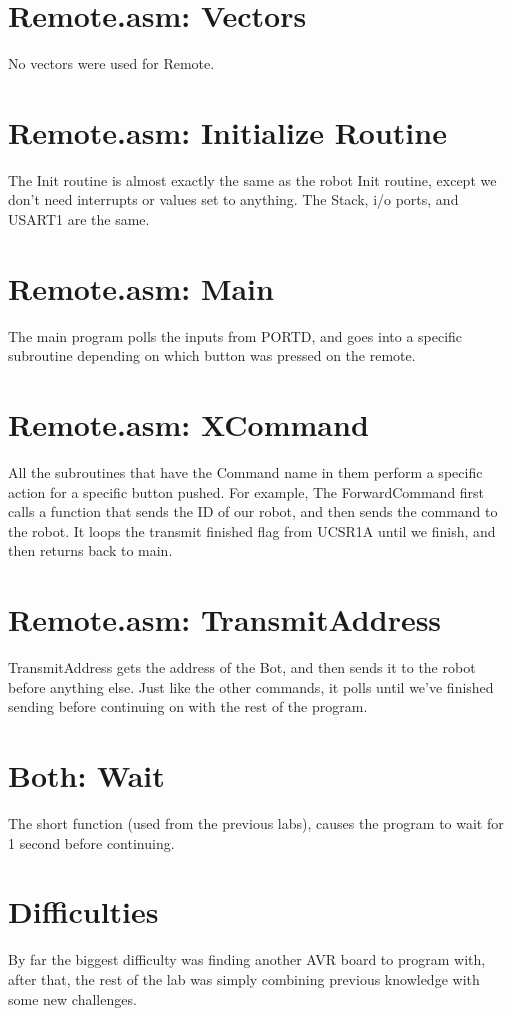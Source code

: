 \documentclass[12pt,letterpaper]{article}
\begin{document}
\section{Remote.asm: Vectors}
No vectors were used for Remote.

\section{Remote.asm: Initialize Routine}
The Init routine is almost exactly the same as the robot Init routine, except we don't need interrupts or values set to anything. The Stack, i/o ports, and USART1 are 
the same.

\section{Remote.asm: Main}
The main program polls the inputs from PORTD, and goes into a specific subroutine depending on which button was pressed on the remote. 

\section{Remote.asm: XCommand}
All the subroutines that have the Command name in them perform a specific action for a specific button pushed. For example, The ForwardCommand first calls a function 
that sends the ID of our robot, and then sends the command to the robot. It loops the transmit finished flag from UCSR1A until we finish, and then returns back to main.

\section{Remote.asm: TransmitAddress}
TransmitAddress gets the address of the Bot, and then sends it to the robot before anything else. Just like the other commands, it polls until we've finished sending 
before continuing on with the rest of the program.

\section{Both: Wait}
The short function (used from the previous labs), causes the program to wait for 1 second before continuing.

\section{Difficulties}
By far the biggest difficulty was finding another AVR board to program with, after that, the rest of the lab was simply combining previous knowledge with some new challenges.
\end{document}
